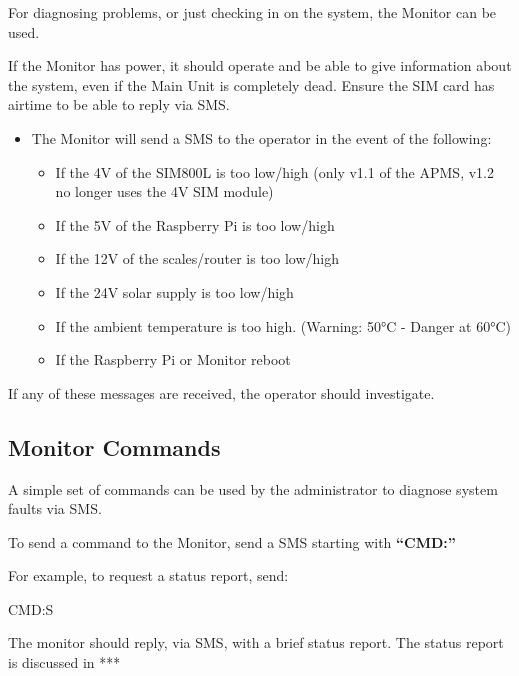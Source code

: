 \documentclass[
  letterpaper,
]{scrbook}
\newenvironment{Shaded}{\begin{snugshade}}{\end{snugshade}}
\newcommand{\ExtensionTok}[1]{\textcolor[rgb]{0.00,0.23,0.31}{#1}}
\begin{document}
For diagnosing problems, or just checking in on the system, the Monitor
can be used.

If the Monitor has power, it should operate and be able to give
information about the system, even if the Main Unit is completely dead.
Ensure the SIM card has airtime to be able to reply via SMS.

\begin{itemize}
\item
  The Monitor will send a SMS to the operator in the event of the
  following:

  \begin{itemize}
  \item
    If the 4V of the SIM800L is too low/high (only v1.1 of the APMS,
    v1.2 no longer uses the 4V SIM module)
  \item
    If the 5V of the Raspberry Pi is too low/high
  \item
    If the 12V of the scales/router is too low/high
  \item
    If the 24V solar supply is too low/high
  \item
    If the ambient temperature is too high. (Warning: 50°C - Danger at
    60°C)
  \item
    If the Raspberry Pi or Monitor reboot
  \end{itemize}
\end{itemize}

If any of these messages are received, the operator should investigate.

\subsection{Monitor Commands}\label{monitor-commands}

A simple set of commands can be used by the administrator to diagnose
system faults via SMS.

To send a command to the Monitor, send a SMS starting with
\textbf{``CMD:''}

For example, to request a status report, send:

\begin{Shaded}
\begin{Highlighting}[]
\ExtensionTok{CMD:S}
\end{Highlighting}
\end{Shaded}

The monitor should reply, via SMS, with a brief status report. The
status report is discussed in ***
\end{document}
